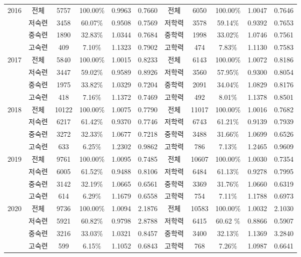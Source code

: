 {\begin{longtable}[htbp]{c|ccccc|ccccc}
    \hline \multirow[t]{4}{*}{2016}  & 전체    & 5757  & 100.00\% & 0.9963 & 0.7660  & 전체    & 6050  & 100.00\% & 1.0047 & 0.7646  \\
    & 저숙련   & 3458  & 60.07\% & 0.9508 & 0.7569 & 저학력   & 3578  & 59.14\% & 0.9392 & 0.7653  \\
    & 중숙련   & 1890  & 32.83\% & 1.0344 & 0.7684 & 중학력   & 1998  & 33.02\% & 1.0746 & 0.7561  \\
    & 고숙련   & 409   & 7.10\% & 1.1323 & 0.7902 & 고학력   & 474   & 7.83\% & 1.1130 & 0.7583  \\
    \hline \multirow[t]{4}{*}{2017}  & 전체    & 5840  & 100.00\% & 1.0015 & 0.8233  & 전체    & 6143  & 100.00\% & 1.0072 & 0.8186  \\
    & 저숙련   & 3447  & 59.02\% & 0.9589 & 0.8926 & 저학력   & 3560  & 57.95\% & 0.9300 & 0.8054  \\
    & 중숙련   & 1975  & 33.82\% & 1.0329 & 0.7204 & 중학력   & 2091  & 34.04\% & 1.0829 & 0.8176  \\
    & 고숙련   & 418   & 7.16\% & 1.1372 & 0.7469 & 고학력   & 492   & 8.01\% & 1.1378 & 0.8501  \\
    \hline \multirow[t]{4}{*}{2018}  & 전체    & 10122 & 100.00\% & 1.0075 & 0.7790  & 전체    & 11017 & 100.00\% & 1.0016 & 0.7682  \\
    & 저숙련   & 6217  & 61.42\% & 0.9370 & 0.7746 & 저학력   & 6743  & 61.21\% & 0.9139 & 0.7939  \\
    & 중숙련   & 3272  & 32.33\% & 1.0677 & 0.7218 & 중학력   & 3488  & 31.66\% & 1.0699 & 0.6526  \\
    & 고숙련   & 633   & 6.25\% & 1.2302 & 0.9862 &  고학력   & 786   & 7.13\% & 1.2465 & 0.9609  \\
    \hline \multirow[t]{4}{*}{2019}  & 전체    & 9761  & 100.00\% & 1.0095 & 0.7485  & 전체    & 10607 & 100.00\% & 1.0030 & 0.7354  \\
    & 저숙련   & 6005  & 61.52\% & 0.9488 & 0.8106 & 저학력   & 6484  & 61.13\% & 0.9278 & 0.7995  \\
    & 중숙련   & 3142  & 32.19\% & 1.0665 & 0.6561 & 중학력   & 3369  & 31.76\% & 1.0660 & 0.6319  \\
    & 고숙련   & 614   & 6.29\% & 1.1679 & 0.6558 & 고학력   & 754   & 7.11\% & 1.1788 & 0.6973  \\
    \hline \multirow[t]{4}{*}{2020}  & 전체    & 9736  & 100.00\% & 1.0094 & 2.1876  & 전체    & 10583 & 100.00\% & 1.0032 & 2.1030  \\
    & 저숙련   & 5921  & 60.82\% & 0.9798 & 2.8788 & 저학력   & 6415  & 60.62 \% & 0.8866 & 0.5907  \\
    & 중숙련   & 3216  & 33.03\% & 1.0321 & 0.8457 & 중학력   & 3400  & 32.13\% & 1.1369 & 3.2840  \\
    & 고숙련   & 599   & 6.15\% & 1.1052 & 0.6843 &  고학력   & 768   & 7.26\% & 1.0987 & 0.6641  \\
\end{longtable}
}